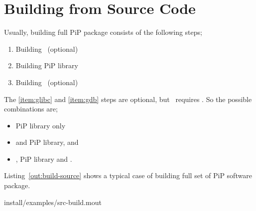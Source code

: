 
\section{Building from Source Code}

Usually, building full PiP package consists of the following steps;

\begin{enumerate}
\item Building \pipglibc\ (optional)\label{item:glibc}
\item Building PiP library
\item Building \pipgdb\ (optional)\label{item:gdb}
\end{enumerate}

The \ref{item:glibc} and \ref{item:gdb} steps are optional, but
\pipgdb\ requires \pipglibc. So the possible combinations are;

\begin{itemize}
\item PiP library only
\item \pipglibc and PiP library, and
\item \pipglibc, PiP library and \pipgdb.
\end{itemize}

Listing~\ref{out:build-source} shows a typical case of building full
set of PiP software package. 


                {install/examples/src-build.mout}
